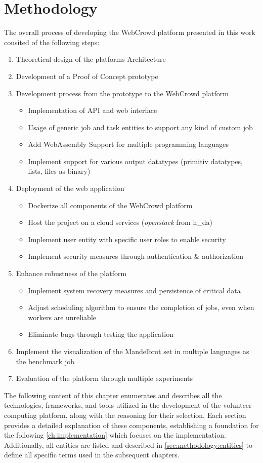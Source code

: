 \chapter{Methodology}
\label{ch:methodology}
The overall process of developing the WebCrowd platform presented in this work consited of the following steps:
\begin{enumerate}
  \item Theoretical design of the platforms Architecture
  \item Development of a Proof of Concept prototype
  \item Development process from the prototype to the WebCrowd platform
  \begin{itemize}
    \item Implementation of \acs{API} and web interface
    \item Usage of generic job and task entities to support any kind of custom job
    \item Add WebAssembly Support for multiple programming languages
    \item Implement support for various output datatypes (primitiv datatypes, lists, files as binary)
  \end{itemize}
  \item Deployment of the web application
  \begin{itemize}
    \item Dockerize all components of the WebCrowd platform
    \item Host the project on a cloud services (\emph{openstack} from h\_da)
    \item Implement user entity with specific user roles to enable security
    \item Implement security measures through authentication \& authorization
  \end{itemize}
  \item Enhance robustness of the platform
  \begin{itemize}
    \item Implement system recovery measures and persistence of critical data
    \item Adjust scheduling algorithm to ensure the completion of jobs, even when workers are unreliable
    \item Eliminate bugs through testing the application
  \end{itemize}
  \item Implement the visualization of the Mandelbrot set in multiple languages as the benchmark job
  \item Evaluation of the platform through multiple experiments 
\end{enumerate}
The following content of this chapter enumerates and describes all the technologies, frameworks, and tools utilized in the development of the volunteer computing platform, along with the reasoning for their selection. Each section provides a detailed explanation of these components, establishing a foundation for the following \autoref{ch:implementation} which focuses on the implementation. Additionally, all entities are listed and described in \autoref{sec:methodology:entities} to define all specific terms used in the subsequent chapters.

